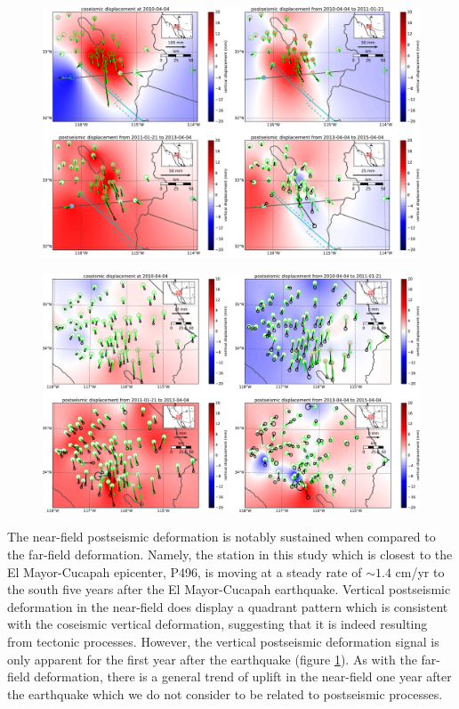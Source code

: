 \documentclass[1p]{elsarticle}
\begin{document}
\begin{figure}
\includegraphics[scale=0.32]{Figures/nearfield}
\centering 
\caption{}
\label{fig:NearField}
\end{figure}

\begin{figure}
\includegraphics[scale=0.32]{Figures/farfield}
\centering 
\caption{}
\label{fig:FarField}
\end{figure}

The near-field postseismic deformation is notably sustained when compared to the far-field deformation.  Namely, the station in this study which is closest to the El Mayor-Cucapah epicenter, P496, is moving at a steady rate of $\sim1.4$ cm/yr to the south five years after the El Mayor-Cucapah earthquake.  Vertical postseismic deformation in the near-field does display a quadrant pattern which is consistent with the coseismic vertical deformation, suggesting that it is indeed resulting from tectonic processes.  However, the vertical postseismic deformation signal is only apparent for the first year after the earthquake (figure \ref{fig:NearField}).  As with the far-field deformation, there is a general trend of uplift in the near-field one year after the earthquake which we do not consider to be related to postseismic processes.  
\end{document}
